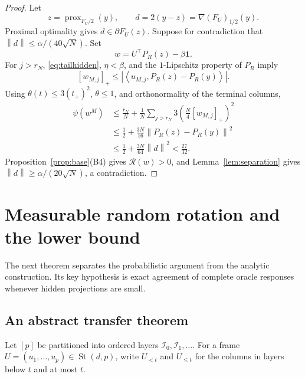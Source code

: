 \documentclass[11pt,a4paper]{article}
\newcommand{\one}{\mathbf 1}
\newcommand{\norm}[1]{\left\lVert #1\right\rVert}
\newcommand{\abs}[1]{\left\lvert #1\right\rvert}
\newcommand{\inner}[2]{\left\langle #1,#2\right\rangle}
\newcommand{\cI}{\mathcal I}
\DeclareMathOperator{\prox}{prox}
\theoremstyle{definition}
\numberwithin{equation}{section}
\newcommand{\St}{\operatorname{St}}
\begin{document}
\begin{proof}
Let
\[
 z=\prox_{F_U/2}(y),
 \qquad
 d=2(y-z)=\nabla(F_U)_{1/2}(y).
\]
Proximal optimality gives $d\in\partial F_U(z)$.  Suppose for contradiction that
$\norm d\le\alpha/(40\sqrt N)$.  Set
\[
 w=U^\top P_R(z)-\beta\one.
\]
For $j>r_N$, \eqref{eq:tailhidden}, $\eta<\beta$, and the $1$-Lipschitz property of $P_R$ imply
\[
 [w_{M,j}]_+
 \le\abs{\inner{u_{M,j}}{P_R(z)-P_R(y)}}.
\]
Using $\theta(t)\le3(t_+)^2$, $\theta\le1$, and orthonormality of the terminal columns,
\begin{align*}
 \psi(w^M)
 &\le\frac{r_N}{N}
 +\frac1N\sum_{j>r_N}3\left(\frac N4[w_{M,j}]_+\right)^2\\
 &\le\frac12+\frac{3N}{16}\norm{P_R(z)-P_R(y)}^2\\
 &\le\frac12+\frac{3N}{64}\norm d^2
 <\frac{27}{32}.
\end{align*}
Proposition~\ref{prop:base}(B4) gives $\mathcal R(w)>0$, and Lemma~\ref{lem:separation} gives
$\norm d\ge\alpha/(20\sqrt N)$, a contradiction.
\end{proof}

\section{Measurable random rotation and the lower bound}\label{sec:abstractrotation}

The next theorem separates the probabilistic argument from the analytic
construction. Its key hypothesis is exact agreement of complete oracle
responses whenever hidden projections are small.

\subsection{An abstract transfer theorem}

Let $[p]$ be partitioned into ordered layers $\cI_0,\cI_1,\ldots$.  For a frame $U=(u_1,\ldots,u_p)\in\St(d,p)$, write $U_{<t}$ and $U_{\le t}$ for the columns in layers below $t$ and at most $t$.
\end{document}
